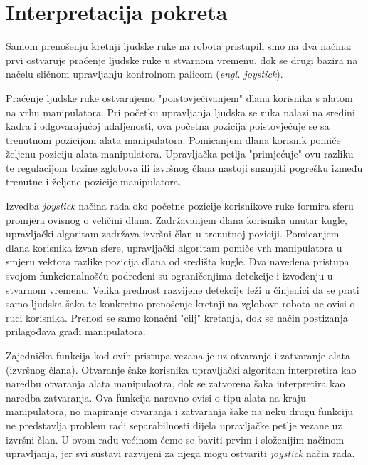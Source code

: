 \documentclass[times, utf8, diplomski, numeric]{fer}
\begin{document}
\section{Interpretacija pokreta}\label{2_1}
Samom prenošenju kretnji ljudske ruke na robota pristupili smo na dva načina: prvi ostvaruje praćenje ljudske ruke u stvarnom vremenu, dok se drugi bazira na načelu sličnom upravljanju kontrolnom palicom (\textit{engl. joystick}).

Praćenje ljudske ruke ostvarujemo "poistovjećivanjem" dlana korisnika s alatom na vrhu manipulatora. 
Pri početku upravljanja ljudska se ruka nalazi na sredini kadra i odgovarajućoj udaljenosti, ova početna pozicija poistovjećuje se sa trenutnom pozicijom alata manipulatora.
Pomicanjem dlana korisnik pomiče željenu poziciju alata manipulatora.
Upravljačka petlja "primjećuje" ovu razliku te regulacijom brzine zglobova ili izvršnog člana nastoji smanjiti pogrešku između trenutne i željene pozicije manipulatora.

Izvedba \textit{joystick} načina rada oko početne pozicije korisnikove ruke formira sferu promjera ovisnog o veličini dlana.
Zadržavanjem dlana korisnika unutar kugle, upravljački algoritam zadržava izvršni član u trenutnoj poziciji.
Pomicanjem dlana korisnika izvan sfere, upravljački algoritam pomiče vrh manipulatora u smjeru vektora razlike pozicija dlana od središta kugle.
Dva navedena pristupa svojom funkcionalnošću podređeni su ograničenjima detekcije i izvođenju u stvarnom vremenu.
Velika prednost razvijene detekcije leži u činjenici da se prati samo ljudska šaka te konkretno prenošenje kretnji na zglobove robota ne ovisi o ruci korisnika.
Prenosi se samo konačni "cilj" kretanja, dok se način postizanja prilagođava građi manipulatora.

Zajednička funkcija kod ovih pristupa vezana je uz otvaranje i zatvaranje alata (izvršnog člana).
Otvaranje šake korisnika upravljački algoritam interpretira kao naredbu otvaranja alata manipulaotra, dok se zatvorena šaka interpretira kao naredba zatvaranja.
Ova funkcija naravno ovisi o tipu alata na kraju manipulatora, no mapiranje otvaranja i zatvaranja šake na neku drugu funkciju ne predstavlja problem radi separabilnosti dijela upravljačke petlje vezane uz izvršni član.
U ovom radu većinom ćemo se baviti prvim i složenijim načinom upravljanja, jer svi sustavi razvijeni za njega mogu ostvariti \textit{joystick} način rada.
\end{document}
